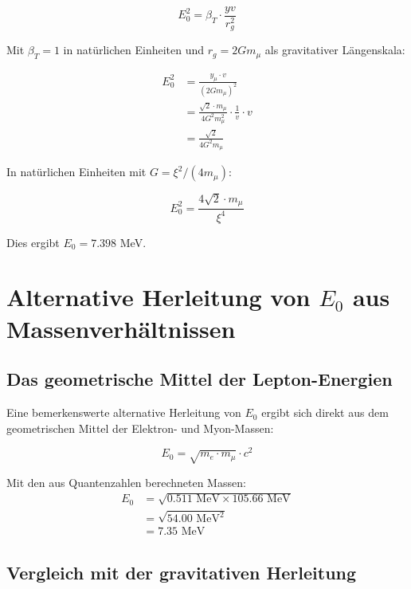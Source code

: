 \documentclass[12pt,a4paper]{article}
\begin{document}
	\begin{equation}
		E_0^2 = \beta_T \cdot \frac{yv}{r_g^2}
	\end{equation}
	
	Mit $\beta_T = 1$ in natürlichen Einheiten und $r_g = 2Gm_\mu$ als gravitativer Längenskala:
	
	\begin{align}
		E_0^2 &= \frac{y_\mu \cdot v}{(2Gm_\mu)^2}\\
		&= \frac{\sqrt{2} \cdot m_\mu}{4G^2 m_\mu^2} \cdot \frac{1}{v} \cdot v\\
		&= \frac{\sqrt{2}}{4G^2 m_\mu}
	\end{align}
	
	In natürlichen Einheiten mit $G = \xi^2/(4m_\mu)$:
	
	\begin{equation}
		E_0^2 = \frac{4\sqrt{2} \cdot m_\mu}{\xi^4}
	\end{equation}
	
	Dies ergibt $E_0 = 7.398$ MeV.
	
	\section{Alternative Herleitung von $E_0$ aus Massenverhältnissen}
	
	\subsection{Das geometrische Mittel der Lepton-Energien}
	
	Eine bemerkenswerte alternative Herleitung von $E_0$ ergibt sich direkt aus dem geometrischen Mittel der Elektron- und Myon-Massen:
	
	\begin{equation}
		E_0 = \sqrt{m_e \cdot m_\mu} \cdot c^2
	\end{equation}
	
	Mit den aus Quantenzahlen berechneten Massen:
	\begin{align}
		E_0 &= \sqrt{0.511 \text{ MeV} \times 105.66 \text{ MeV}}\\
		&= \sqrt{54.00 \text{ MeV}^2}\\
		&= 7.35 \text{ MeV}
	\end{align}
	
	\subsection{Vergleich mit der gravitativen Herleitung}
	
\end{document}
